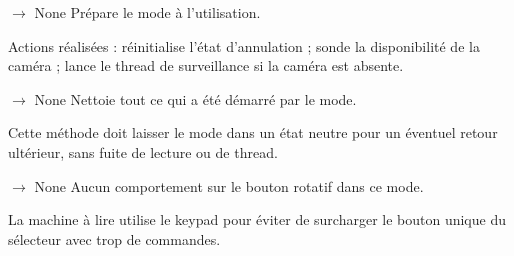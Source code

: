 \documentclass[letterpaper,10pt,french]{sphinxmanual}
\begin{document}
\begin{fulllineitems}

\begin{fulllineitems}
\label{\detokenize{api/modes:modes.mode_reading_machine.ModeReadingMachine.on_enter}}
\pysigstartsignatures
\pysiglinewithargsret
{}
{}
{{ $\rightarrow$ None}}
\pysigstopsignatures
\sphinxAtStartPar
Prépare le mode à l’utilisation.

\sphinxAtStartPar
Actions réalisées :
\sphinxhyphen{} réinitialise l’état d’annulation ;
\sphinxhyphen{} sonde la disponibilité de la caméra ;
\sphinxhyphen{} lance le thread de surveillance si la caméra est absente.

\end{fulllineitems}


\begin{fulllineitems}
\label{\detokenize{api/modes:modes.mode_reading_machine.ModeReadingMachine.on_exit}}
\pysigstartsignatures
\pysiglinewithargsret
{}
{}
{{ $\rightarrow$ None}}
\pysigstopsignatures
\sphinxAtStartPar
Nettoie tout ce qui a été démarré par le mode.

\sphinxAtStartPar
Cette méthode doit laisser le mode dans un état neutre pour un
éventuel retour ultérieur, sans fuite de lecture ou de thread.

\end{fulllineitems}


\begin{fulllineitems}
\label{\detokenize{api/modes:modes.mode_reading_machine.ModeReadingMachine.on_short_press}}
\pysigstartsignatures
\pysiglinewithargsret
{}
{}
{{ $\rightarrow$ None}}
\pysigstopsignatures
\sphinxAtStartPar
Aucun comportement sur le bouton rotatif dans ce mode.

\sphinxAtStartPar
La machine à lire utilise le keypad pour éviter de surcharger le
bouton unique du sélecteur avec trop de commandes.


\end{fulllineitems}
\end{fulllineitems}
\end{document}

